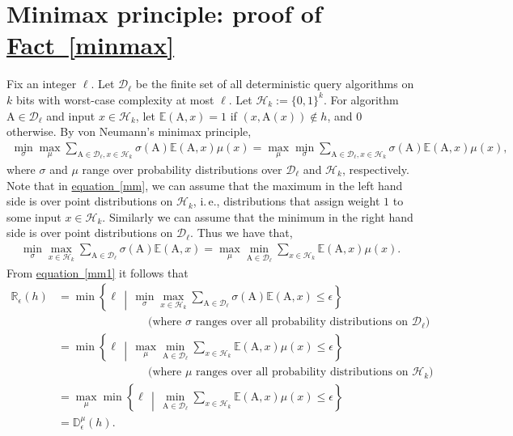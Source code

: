 \documentclass[11pt]{article}
\numberwithin{equation}{section}
\theoremstyle{definition}
\theoremstyle{plain}
\newcommand{\R}{\mathbb R}
\newcommand{\ie}{i.\,e.}
\newcommand{\expref}[2]{\hyperref[#2]{#1~\ref{#2}}}
\newcommand{\expeqref}[2]{\hyperref[#2]{#1~\eqref{#2}}}
\newcommand{\md}{\middle}
\newcommand{\sett}[2]{\ensuremath{\left\{#1\,\md|\,#2\right\}}}
\newcommand{\D}{\mathbb{D}}
\newcommand{\clD}{\mathcal{D}}
\newcommand{\clH}{\mathcal{H}}
\newcommand{\E}{\mathbb{E}}
\newcommand{\A}{\text{A}}
\begin{document}
%
%
%
%


%
%

\appendix


\section{Minimax principle: proof of \expref{Fact}{minmax}}
\label{mmax}
Fix an integer $\ell$. Let $\mathcal{D}_\ell$ be the finite set of all deterministic query algorithms on $k$ bits with worst-case complexity at most $\ell$. Let $\clH_k:=\{0,1\}^k$. For algorithm $\A \in \clD_\ell$ and input $x \in \clH_k$, let $\E(\A,x)=1$ if $(x,\A(x)) \notin h$, and $0$ otherwise. By von Neumann's minimax principle,
\begin{align}\min_{\sigma} \max_{\mu} \sum_{\A \in \clD_\ell, x \in \clH_k} \sigma(\A)\E(\A, x)\mu(x)= \max_{\mu} \min_{\sigma} \sum_{\A \in \clD_\ell, x \in \clH_k} \sigma(\A)\E(\A, x)\mu(x),\label{mm}\end{align}
where $\sigma$ and $\mu$ range over probability distributions over $\clD_\ell$ and $\clH_k$, respectively.  Note that in \expeqref{equation}{mm}, we can assume that the maximum in the left hand side is over  point distributions on $\clH_k$, \ie, distributions that assign weight $1$ to some input $x \in \clH_k$. Similarly we can assume that the minimum in the right hand side is over point distributions on $\clD_\ell$. Thus we have that,
\begin{align}
\min_{\sigma} \max_{x \in \clH_k} \sum_{\A \in \clD_\ell} \sigma(\A)\E(\A,x)=\max_{\mu} \min_{\A \in \clD_\ell}  \sum_{x \in \clH_k} \E(\A,x) \mu(x).\label{mm1}
\end{align}
From \expeqref{equation}{mm1} it follows that
%
%
\begin{align*}
\R_\epsilon(h) &= \min \sett{\ell }{ \min_{\sigma} \max_{x \in \clH_k} \sum_{\A \in \clD_\ell} \sigma(\A)\E(\A,x) \leq \epsilon} \\
& \qquad \qquad \qquad \qquad \mbox{(where $\sigma$ ranges over all probability distributions on $\clD_\ell$)} \\
&= \min \sett{\ell} {\max_\mu \min_{\A \in \clD_\ell} \sum_{x \in \clH_k} \E(\A,x) \mu(x) \leq \epsilon}\\
& \qquad \qquad \qquad \qquad \mbox{(where $\mu$ ranges over all probability distributions on $\clH_k$)} \\
&=\max_{\mu} \min \sett{\ell}{\min_{\A \in \clD_\ell} \sum_{x \in \clH_k} \E(\A,x) \mu(x) \leq \epsilon} \\
&=\D^\mu_\epsilon(h).
\end{align*}
\end{document}
